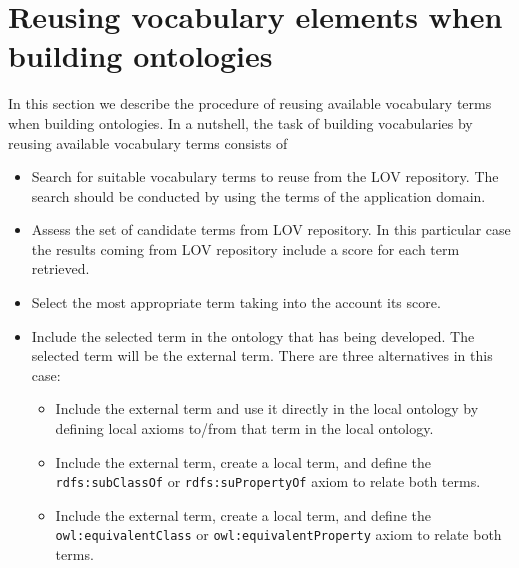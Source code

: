 
\vspace{-3mm}
\section{Reusing vocabulary elements when building ontologies}\label{sec:reuse}
In this section we describe the procedure of reusing available vocabulary terms when building ontologies. In a nutshell, the task of building vocabularies by reusing available vocabulary terms consists of
\vspace{-1mm}
\begin{itemize}
	\item Search for suitable vocabulary terms to reuse from the LOV repository. The search should be conducted by using the terms of the application domain.
	\item Assess the set of candidate terms from LOV repository. In this particular case the results coming from LOV repository include a score for each term retrieved.
	\item Select the most appropriate term taking into the account its score.
	\item Include the selected term in the ontology that has being developed. The selected term will be the external term. There are three alternatives in this case: 
	\begin{itemize}
		\item Include the external term and use it directly in the local ontology by defining local axioms to/from that term in the local ontology.
		\item Include the external term, create a local term, and define the {\tt rdfs:subClassOf} or {\tt rdfs:suPropertyOf} axiom to relate both terms.
		\item Include the external term, create a local term, and define the {\tt owl:equivalentClass} or {\tt owl:equivalentProperty} axiom to relate both terms. 				
	\end{itemize}
\end{itemize}

